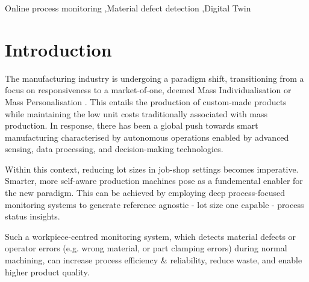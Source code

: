 \documentclass[5p,times,procedia]{elsarticle}
\begin{document}
\begin{frontmatter}
\begin{keyword}
 Online process monitoring \sep Material defect detection \sep Digital Twin





\end{keyword}

\end{frontmatter}


\section{Introduction}\label{Sec_Introduction}


The manufacturing industry is undergoing a paradigm shift, transitioning from a focus on responsiveness to a market-of-one, deemed Mass Individualisation\cite{Lu.Xu.ea2020} or Mass Personalisation \cite{Qin.Lu2021}. This entails the production of custom-made products while maintaining the low unit costs traditionally associated with mass production.
In response, there has been a global push towards smart manufacturing characterised by autonomous operations enabled by advanced sensing, data processing, and decision-making technologies. \cite{Gu.Koren2022, Lu.Morris.ea2016}

Within this context, reducing lot sizes in job-shop settings becomes imperative.
Smarter, more self-aware production machines pose as a fundemental enabler for the new paradigm. This can be achieved by employing deep process-focused monitoring systems to generate reference agnostic - lot size one capable - process status insights.

Such a workpiece-centred monitoring system, which detects material defects or operator errors (e.g. wrong material, or part clamping errors) during normal machining, can increase process efficiency \& reliability, reduce waste, and enable higher product quality.  
\end{document}
